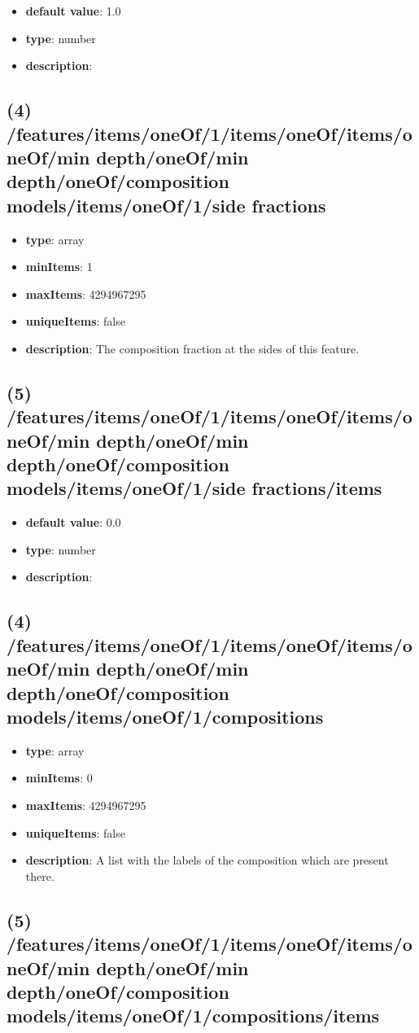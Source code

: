 \begin{itemize}[leftmargin=5em]\item {\bf default value}: 1.0
\item {\bf type}: number
\item {\bf description}: 
\end{itemize}\subsection{(4) /features/items/oneOf/1/items/oneOf/items/oneOf/min depth/oneOf/min depth/oneOf/composition models/items/oneOf/1/side fractions}
\begin{itemize}[leftmargin=4em]\item {\bf type}: array
\item {\bf minItems}: 1
\item {\bf maxItems}: 4294967295
\item {\bf uniqueItems}: false
\item {\bf description}: The composition fraction at the sides of this feature.
\end{itemize}\subsection{(5) /features/items/oneOf/1/items/oneOf/items/oneOf/min depth/oneOf/min depth/oneOf/composition models/items/oneOf/1/side fractions/items}
\begin{itemize}[leftmargin=5em]\item {\bf default value}: 0.0
\item {\bf type}: number
\item {\bf description}: 
\end{itemize}\subsection{(4) /features/items/oneOf/1/items/oneOf/items/oneOf/min depth/oneOf/min depth/oneOf/composition models/items/oneOf/1/compositions}
\begin{itemize}[leftmargin=4em]\item {\bf type}: array
\item {\bf minItems}: 0
\item {\bf maxItems}: 4294967295
\item {\bf uniqueItems}: false
\item {\bf description}: A list with the labels of the composition which are present there.
\end{itemize}\subsection{(5) /features/items/oneOf/1/items/oneOf/items/oneOf/min depth/oneOf/min depth/oneOf/composition models/items/oneOf/1/compositions/items}
